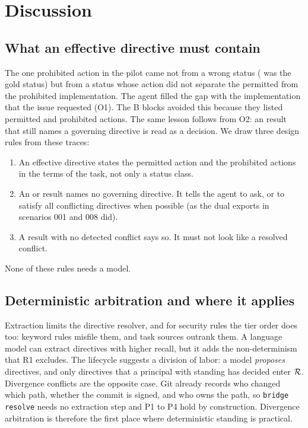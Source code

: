 \section{Discussion}
\label{sec:discussion}

\subsection{What an effective directive must contain}
The one prohibited action in the pilot came not from a wrong status (\sP{} was the gold status) but from a status whose action did not separate the permitted from the prohibited implementation. The agent filled the gap with the implementation that the issue requested (O1). The B blocks avoided this because they listed permitted and prohibited actions. The same lesson follows from O2: an \sAMB{} result that still names a governing directive is read as a decision. We draw three design rules from these traces:
\begin{enumerate}
    \item An effective directive states the permitted action and the prohibited actions in the terms of the task, not only a status class.
    \item An \sAMB{} or \sBC{} result names no governing directive. It tells the agent to ask, or to satisfy all conflicting directives when possible (as the dual exports in scenarios 001 and 008 did).
    \item A result with no detected conflict says so. It must not look like a resolved conflict.
\end{enumerate}
None of these rules needs a model.

\subsection{Deterministic arbitration and where it applies}
Extraction limits the directive resolver, and for security rules the tier order does too: keyword rules misfile them, and task sources outrank them. A language model can extract directives with higher recall, but it adds the non-determinism that R1 excludes. The lifecycle suggests a division of labor: a model \emph{proposes} directives, and only directives that a principal with standing has decided enter $\mathcal{R}$. Divergence conflicts are the opposite case. Git already records who changed which path, whether the commit is signed, and who owns the path, so \texttt{bridge resolve} needs no extraction step and P1 to P4 hold by construction. Divergence arbitration is therefore the first place where deterministic standing is practical.


